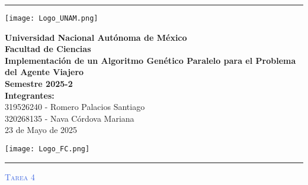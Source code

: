 \documentclass{article}
\renewcommand{\TituloMain}[0]{Tarea 4}
\newcommand{\MateriaMain}[0]{Implementación de un Algoritmo Genético Paralelo para el Problema del Agente Viajero}
\newcommand{\FechaMain}[0]{23 de Mayo de 2025}
\begin{document}
    \begin{titlepage}
    \begin{centering}

        \thispagestyle{empty}
        
        \setlength{\parindent}{0cm}
        
        \rule{\linewidth}{0.1mm}
        \begin{center}
            \begin{minipage}{2.5cm}
                \begin{center}
                \texttt{[image: Logo\_UNAM.png]}
                \end{center}
            \end{minipage}\hfill
            \begin{minipage}{10cm}
                \begin{center}
                \textbf{ Universidad Nacional Autónoma de México}\\[0.1cm]
                \textbf{Facultad de Ciencias}\\[0.1cm]
                \textbf{\MateriaMain}\\[0.1cm]
                \textbf{Semestre 2025-2}\\[0.1cm]
                \textbf{Integrantes: }\\[0.1cm]
                319526240 - Romero Palacios Santiago\\[0.1cm]
                320268135 - Nava Córdova Mariana\\[0.1cm]
                \FechaMain
                \end{center}
            \end{minipage}\hfill
            \begin{minipage}{2.5cm}
                \begin{center}
                \texttt{[image: Logo\_FC.png]}
                \end{center}
            \end{minipage}
        \end{center}
        \rule{\linewidth}{0.1mm}
        
        
        
        \date{}
        \vspace{0.5cm}
        \vspace{0.5cm}
            {\scshape\Huge \textcolor{RoyalBlue}{\TituloMain} \par}
            {
                \vspace*{2mm}
                \begin{center}\begin{minipage}{6.5cm}
                \centering \tableofcontents
                \end{minipage}\end{center}
            }
        \vspace{0.5cm}
        
        \vspace{1cm}
        \vfill
    \end{centering}
    \end{titlepage}


    \pagestyle{logotipos}

    \printbibliography
\end{document}
